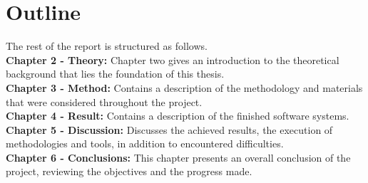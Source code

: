 \section{Outline}

The rest of the report is structured as follows.\\
\break
\textbf{Chapter 2 - Theory:} Chapter two gives an introduction to the theoretical background that lies the foundation of this thesis.\\
\break
\textbf{Chapter 3 - Method:} Contains a description of the methodology and materials that were considered throughout the project.\\
\break
\textbf{Chapter 4 - Result:} Contains a description of the finished software systems.\\
\break
\textbf{Chapter 5 - Discussion:} Discusses the achieved results, the execution of methodologies and tools, in addition to encountered difficulties.\\
\break
\textbf{Chapter 6 - Conclusions:} This chapter presents an overall conclusion of the project, reviewing the objectives and the progress made.\\